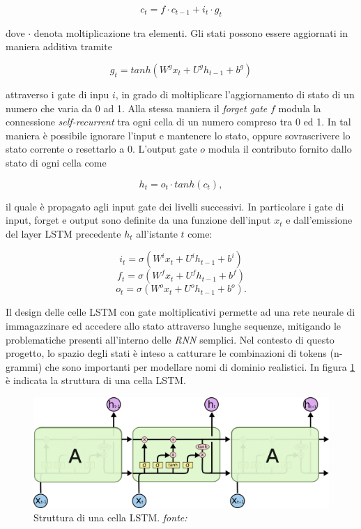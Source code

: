 \[c_t = f \cdot c_{t-1} + i_t \cdot g_t\]

dove $\cdot$ denota moltiplicazione tra elementi. Gli stati possono essere aggiornati in maniera additiva tramite

\[g_t = tanh(W^gx_t + U^gh_{t-1}+b^g)\]


attraverso i gate di inpu $i$, in grado di moltiplicare l'aggiornamento di stato di un numero che varia da 0 ad 1. Alla stessa maniera il \textit{forget gate} $f$ modula la connessione \textit{self-recurrent} tra ogni cella di un numero compreso tra 0 ed 1. In tal maniera è possibile ignorare l'input e mantenere lo stato, oppure sovrascrivere lo stato corrente o resettarlo a 0.
L'output gate $o$ modula il contributo fornito dallo stato di ogni cella come

\[h_t = o_t \cdot tanh(c_t),\]

il quale è propagato agli input gate dei livelli successivi. In particolare i gate di input, forget e output sono definite da una funzione dell'input $x_t$  e dall'emissione del layer LSTM precedente $h_t$ all'istante $t$ come:

\[i_t=\sigma\left(W^ix_t+U^ih_{t-1}+b^i\right)\]
\[f_t=\sigma\left(W^fx_t+U^fh_{t-1}+b^f\right)\]
\[o_t=\sigma\left(W^ox_t+U^oh_{t-1}+b^o\right).\]


Il design delle celle LSTM con gate moltiplicativi permette ad una rete neurale di immagazzinare ed accedere allo stato attraverso lunghe sequenze, mitigando le problematiche presenti all'interno delle \textit{RNN} semplici. Nel contesto di questo progetto, lo spazio degli stati è inteso a catturare le combinazioni di tokens (n-grammi) che sono importanti per modellare nomi di dominio realistici. In figura \ref{fig:lstm} è indicata la struttura di una cella LSTM.

\begin{figure}[htb]
    \centering
	\includegraphics[width=\columnwidth]{figures/LSTM3-chain.png}
	\caption{Struttura di una cella LSTM. \textit{fonte:} \cite{lstmblog} }
\label{fig:lstm}
\end{figure}

